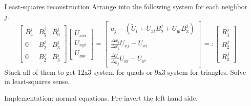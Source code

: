 \documentclass[11pt]{beamer}
\begin{document}
\begin{frame}{Least-squares reconstruction}
Arrange into the following system for each neighbor $j$.
\begin{equation}
\begin{bmatrix}
B_4^j & B_5^j & B_6^j \\
0 & B_2^j & B_3^j \\
0 & B_2^j & B_3^j
\end{bmatrix}
\begin{bmatrix}
U_{xxi} \\ U_{xyi} \\ U_{yyi}
\end{bmatrix} =
\begin{bmatrix}
u_j - (\tilde{U}_i + U_{xi}B_2^j + U_{yi}B_3^j) \\
\frac{\Delta x_i}{\Delta x_j}U_{xj} - U_{xi} \\
\frac{\Delta y_i}{\Delta y_j}U_{yj} - U_{yi}
\end{bmatrix} =:
\begin{bmatrix}
R_1^j \\ R_2^j \\ R_3^j
\end{bmatrix}
\end{equation}
Stack all of them to get 12x3 system for quads or 9x3 system for triangles. Solve in least-squares sense.

Implementation: normal equations. Pre-invert the left hand side.
\end{frame}
\end{document}

